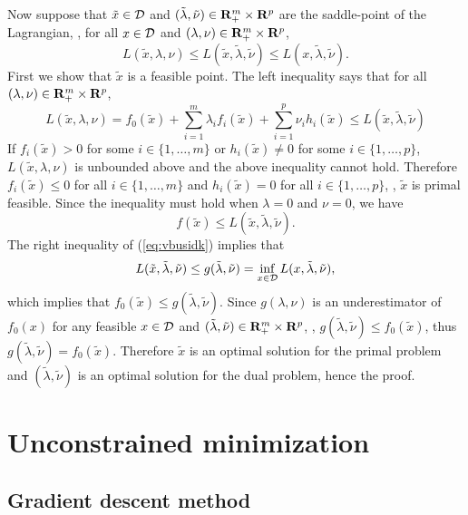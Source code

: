 Now suppose that $\tilde{x}\in\mathcal{D}$ and $(\tilde{\lambda}, \tilde{\nu}) \in \mathbf{R}^m_+ \times \mathbf{R}^p$
are the saddle-point of the Lagrangian, \ie,
for all $x\in\mathcal{D}$ and $(\lambda, \nu) \in \mathbf{R}^m_+ \times \mathbf{R}^p$,
\begin{equation}
\label{eq:vbusidk}
L(\tilde{x}, \lambda, \nu)
\leq L(\tilde{x}, \tilde{\lambda}, \tilde{\nu})
\leq L(x, \tilde{\lambda}, \tilde{\nu}).
\end{equation}
First we show that $\tilde{x}$ is a feasible point.
The left inequality says that for all $(\lambda, \nu) \in \mathbf{R}^m_+ \times \mathbf{R}^p$,
\begin{equation}
L(\tilde{x}, \lambda, \nu)=
f_0(\tilde{x}) + \sum_{i=1}^m \lambda_i f_i(\tilde{x}) + \sum_{i=1}^p \nu_i h_i(\tilde{x})
\leq L(\tilde{x}, \tilde{\lambda}, \tilde{\nu})
\end{equation}
If $f_i(\tilde{x})>0$ for some $i\in\{1,\ldots,m\}$ or
$h_i(\tilde{x})\neq 0$ for some $i\in\{1,\ldots,p\}$,
$L(\tilde{x}, \lambda, \nu)$ is unbounded above and the above inequality cannot hold.
Therefore $f_i(\tilde{x})\leq0$ for all $i\in\{1,\ldots,m\}$ and $h_i(\tilde{x})= 0$ for all $i\in\{1,\ldots,p\}$,
\ie, $\tilde{x}$ is primal feasible.
Since the inequality must hold when $\lambda = 0$ and $\nu =0$,
we have
\begin{equation}
\label{eq:cidkshx}
f(\tilde{x}) \leq L(\tilde{x}, \tilde{\lambda}, \tilde{\nu}).
\end{equation}
The right inequality
of (\ref{eq:vbusidk})
implies that
\begin{equation}
\label{eq:vydsuxk}
L(\tilde{x}, \tilde{\lambda}, \tilde{\nu})
\leq g(\tilde{\lambda}, \tilde{\nu}) = \inf_{x\in\mathcal{D}} L({x}, \tilde{\lambda}, \tilde{\nu}),
\end{equation}
which implies that $f_0(\tilde{x}) \leq g(\tilde{\lambda}, \tilde{\nu})$.
Since $g(\lambda, \nu)$ is an underestimator of $f_0(x)$ for any feasible $x\in\mathcal{D}$ and $(\tilde{\lambda}, \tilde{\nu}) \in \mathbf{R}^m_+ \times \mathbf{R}^p$,
\ie, $g(\tilde{\lambda}, \tilde{\nu}) \leq f_0(\tilde{x})$, thus
$g(\tilde{\lambda}, \tilde{\nu}) = f_0(\tilde{x})$.
Therefore $\tilde{x}$ is an optimal solution for the primal problem
and $(\tilde{\lambda}, \tilde{\nu})$  is an optimal solution for the dual problem,
hence the proof.


\section{Unconstrained minimization}
\subsection{Gradient descent method}

